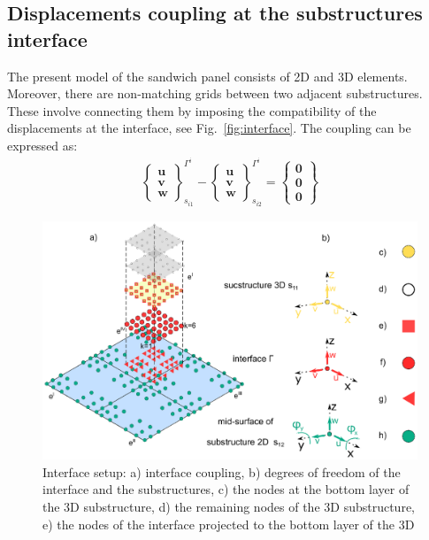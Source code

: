 \documentclass[a4paper,12pt]{article}
\begin{document}
{\subsection{Displacements coupling at the substructures interface}
\label{sec:interface}
The present model of the sandwich panel consists of 2D and 3D elements. 
Moreover, there are non-matching grids between two adjacent substructures. 
These involve connecting them by imposing the compatibility of the 
displacements at the interface, see Fig.~\ref{fig:interface}.
The coupling can be expressed as:
\begin{eqnarray}
\left\{\begin{array}{c}
	\textbf{u}\\
	\textbf{v}\\
	\textbf{w}
	\end{array}\right\}_{s_{i1}}^{\Gamma^i}-
	\left\{\begin{array}{c}
	\textbf{u}\\
	\textbf{v}\\
	\textbf{w}
	\end{array}\right\}_{s_{i2}}^{\Gamma^i}=
	\left\{\begin{array}{c}
	\textbf{0}\\
	\textbf{0}\\
	\textbf{0}
	\end{array}\right\}
\label{eq:coupling}
\end{eqnarray}
\begin{figure}
	\begin{center}
		\includegraphics[width=1\linewidth]{../../../figures/eps/interface_2D3D.eps}
	\end{center}
	\caption{Interface setup: a) interface coupling, b) degrees of freedom of the interface and the substructures, c) the nodes at the bottom layer of the 3D substructure, d) the remaining nodes of the 3D substructure, e) the nodes of the interface projected to the bottom layer of the 3D 
}
\end{figure}}
\end{document}
